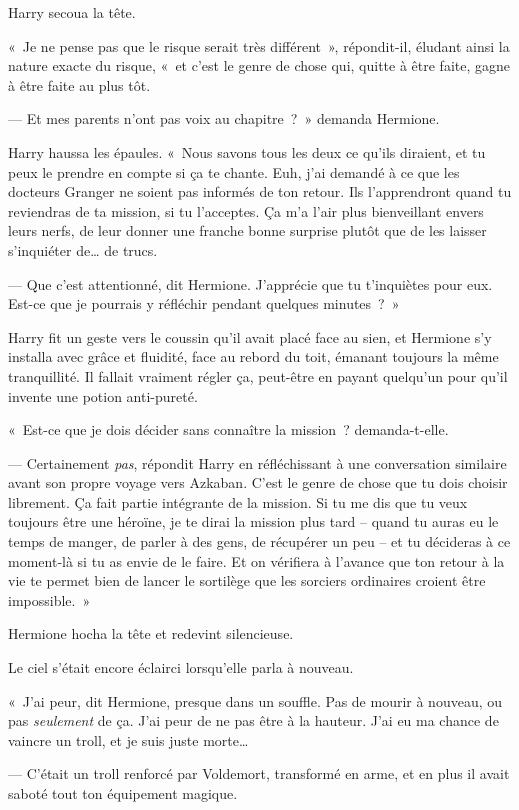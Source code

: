 Harry secoua la tête.

«~Je ne pense pas que le risque serait très différent~», répondit-il, éludant ainsi la nature exacte du risque, «~et c'est le genre de chose qui, quitte à être faite, gagne à être faite au plus tôt.

--- Et mes parents n'ont pas voix au chapitre~?~» demanda Hermione.

Harry haussa les épaules. «~Nous savons tous les deux ce qu'ils diraient, et tu peux le prendre en compte si ça te chante. Euh, j'ai demandé à ce que les docteurs Granger ne soient pas informés de ton retour. Ils l'apprendront quand tu reviendras de ta mission, si tu l'acceptes. Ça m'a l'air plus bienveillant envers leurs nerfs, de leur donner une franche bonne surprise plutôt que de les laisser s'inquiéter de… de trucs.

--- Que c'est attentionné, dit Hermione. J'apprécie que tu t'inquiètes pour eux. Est-ce que je pourrais y réfléchir pendant quelques minutes~?~»

Harry fit un geste vers le coussin qu'il avait placé face au sien, et Hermione s'y installa avec grâce et fluidité, face au rebord du toit, émanant toujours la même tranquillité. Il fallait vraiment régler ça, peut-être en payant quelqu'un pour qu'il invente une potion anti-pureté.

«~Est-ce que je dois décider sans connaître la mission~? demanda-t-elle.

--- Certainement \emph{pas}, répondit Harry en réfléchissant à une conversation similaire avant son propre voyage vers Azkaban. C'est le genre de chose que tu dois choisir librement. Ça fait partie intégrante de la mission. Si tu me dis que tu veux toujours être une héroïne, je te dirai la mission plus tard -- quand tu auras eu le temps de manger, de parler à des gens, de récupérer un peu -- et tu décideras à ce moment-là si tu as envie de le faire. Et on vérifiera à l'avance que ton retour à la vie te permet bien de lancer le sortilège que les sorciers ordinaires croient être impossible.~»

Hermione hocha la tête et redevint silencieuse.

Le ciel s'était encore éclairci lorsqu'elle parla à nouveau.

«~J'ai peur, dit Hermione, presque dans un souffle. Pas de mourir à nouveau, ou pas \emph{seulement} de ça. J'ai peur de ne pas être à la hauteur. J'ai eu ma chance de vaincre un troll, et je suis juste morte…

--- C'était un troll renforcé par Voldemort, transformé en arme, et en plus il avait saboté tout ton équipement magique.

